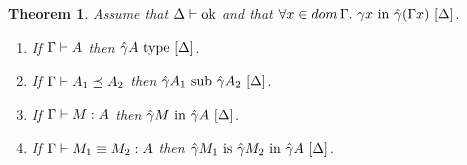 \documentclass{article}
\newtheorem{theorem}{Theorem}
\newcommand{\dom}{\mathop{dom}}
\newcommand{\env}{\gamma}
\theoremstyle{break}
\begin{document}
\begin{theorem}
Assume that ${\Delta}\vdash\mbox{ok}$ and that
$\forall\cvar\in\dom\context.\ \semanticvalidterm{\world}{\env\cvar}{\hat\env(\context\cvar)}$.
\begin{enumerate}
\item If $\Gamma\vdash A$ then $\semanticvalidtype{\world}{\hat\env\kind}$.
\item If $\mbox{$\Gamma\vdash A_1 \preceq A_2$}$ then
$\semanticsubtype{\world}{\hat\env\kind_1}{\hat\env\kind_2}$.
\item If $\Gamma\vdash M : A$ then
$\semanticvalidterm{\world}{\hat\env\constructor}{\hat\env\kind}$.
\item If $\Gamma\vdash M_1 \equiv M_2 : A$
then $\semanticequivterm{\world}{\hat\env\constructor_1}{\hat\env\constructor_2}{\hat\env\kind}$.
\end{enumerate}
\end{theorem}
\end{document}
